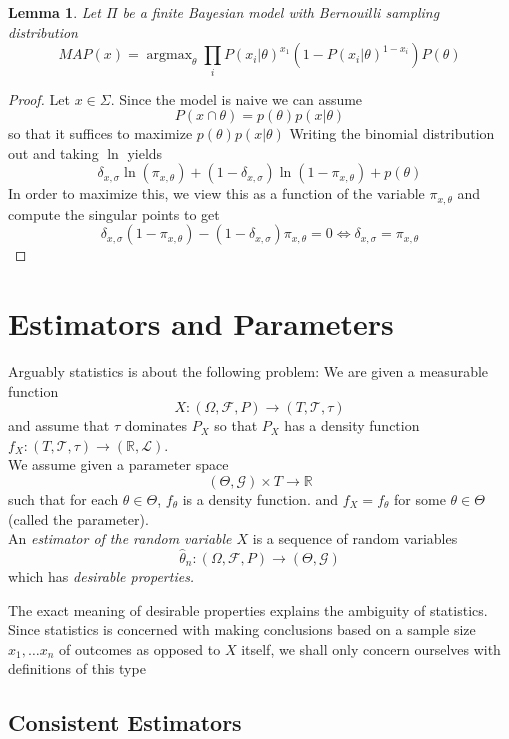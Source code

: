 \documentclass{book}
\theoremstyle{plain}
\newtheorem{lemma}[corollary]{Lemma}
\theoremstyle{definition}
\DeclareMathOperator{\argmax}{argmax}
\renewcommand{\d}[1]{\mathbb{#1}}
\newcommand{\mor}{\longrightarrow}
\renewcommand{\r}[1]{\mathcal{#1}}
\renewcommand{\r}[1]{\mathcal{#1}}
\begin{document}
\begin{lemma}
Let $\Pi$ be a finite Bayesian model with Bernouilli sampling distribution
\[
MAP(x)=\argmax_\theta \prod_i P(x_i\vert \theta)^{x_1}(1-P(x_i\vert \theta)^{1-x_i})P(\theta)
\]
\end{lemma}


\begin{proof}
Let $x \in \Sigma$. Since the model is naive we can assume
\[
P(x\cap \theta)=p(\theta)p(x\vert \theta)
\]	
so that it suffices to maximize $p(\theta)p(x\vert \theta)$
Writing the binomial distribution out and taking $\ln$ yields
\[
\delta_{x,\sigma}\ln(\pi_{x,\theta})+(1-\delta_{x,\sigma})\ln(1-\pi_{x,\theta})+p(\theta)
\]
In order to maximize this, we view this as a function of the variable $\pi_{x,\theta}$ and compute the singular points to get
\[
\delta_{x,\sigma}(1-\pi_{x,\theta})-(1-\delta_{x,\sigma})\pi_{x,\theta}=0\iff \delta_{x,\sigma}=\pi_{x,\theta}
\]

\end{proof}



\section{Estimators and Parameters}

Arguably statistics is about the following problem: We are given a measurable function
\[
X:(\Omega, \r{F}, P)\mor (T,\r{T},\tau)
\]
and assume that $\tau$ dominates $P_X$ so that $P_X$ has a density function $f_X: (T,\r{T},\tau) \mor (\d{R},\r{L})$.\\
We assume given a parameter space
\[
(\Theta, \r{G})\times T\mor \d{R}
\]
such that for each $\theta \in \Theta$, $f_\theta$ is a density function. and $f_X=f_\theta$ for some $\theta \in \Theta$ (called the parameter).\\
An \emph{estimator of the random variable $X$} is a sequence of random variables
\[
\hat{\theta}_n:(\Omega,\r{F},P)\mor (\Theta, \r{G})
\] 
which has \emph{desirable properties.}
\begin{center}
The exact meaning of desirable properties explains the ambiguity of statistics. Since statistics is concerned with making conclusions based on a sample size $x_1,\ldots x_n$ of outcomes as opposed to $X$ itself, we shall only concern ourselves with definitions of this type
\end{center}
 
 
\subsection{Consistent Estimators}
\end{document}
